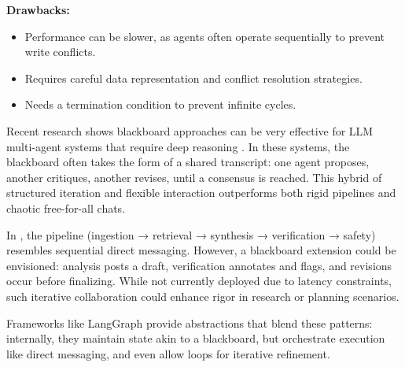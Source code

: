 \textbf{Drawbacks:}  
\begin{itemize}
    \item Performance can be slower, as agents often operate sequentially to prevent write conflicts.  
    \item Requires careful data representation and conflict resolution strategies.  
    \item Needs a termination condition to prevent infinite cycles.  
\end{itemize}  

Recent research shows blackboard approaches can be very effective for LLM multi-agent systems that require deep reasoning \cite{emergentmind2}. In these systems, the blackboard often takes the form of a shared transcript: one agent proposes, another critiques, another revises, until a consensus is reached. This hybrid of structured iteration and flexible interaction outperforms both rigid pipelines and chaotic free-for-all chats.  

In \ishtar{}, the pipeline (ingestion → retrieval → synthesis → verification → safety) resembles sequential direct messaging. However, a blackboard extension could be envisioned: analysis posts a draft, verification annotates and flags, and revisions occur before finalizing. While not currently deployed due to latency constraints, such iterative collaboration could enhance rigor in research or planning scenarios.  

Frameworks like LangGraph \cite{langchain} provide abstractions that blend these patterns: internally, they maintain state akin to a blackboard, but orchestrate execution like direct messaging, and even allow loops for iterative refinement.

